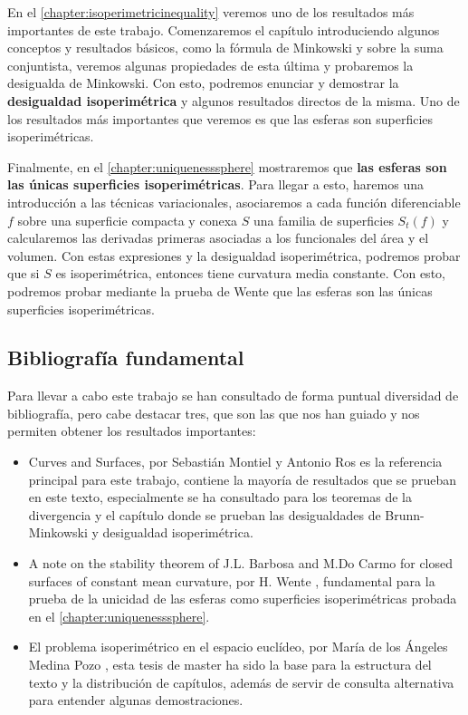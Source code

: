 En el \autoref{chapter:isoperimetricinequality} veremos uno de los resultados más importantes de este trabajo. Comenzaremos el capítulo introduciendo algunos conceptos y resultados básicos, como la fórmula de Minkowski y sobre la suma conjuntista, veremos algunas propiedades de esta última y probaremos la desigualda de Minkowski. Con esto, podremos enunciar y demostrar la \textbf{desigualdad isoperimétrica} y algunos resultados directos de la misma. Uno de los resultados más importantes que veremos es que las esferas son superficies isoperimétricas.

Finalmente, en el \autoref{chapter:uniquenesssphere} mostraremos que \textbf{las esferas son las únicas superficies isoperimétricas}. Para llegar a esto, haremos una introducción a las técnicas variacionales, asociaremos a cada función diferenciable $f$ sobre una superficie compacta y conexa $S$ una familia de superficies $S_t(f)$ y calcularemos las derivadas primeras asociadas a los funcionales del área y el volumen. Con estas expresiones y la desigualdad isoperimétrica, podremos probar que si $S$ es isoperimétrica, entonces tiene curvatura media constante. Con esto, podremos probar mediante la prueba de Wente que las esferas son las únicas superficies isoperimétricas.

\subsection{Bibliografía fundamental}

Para llevar a cabo este trabajo se han consultado de forma puntual diversidad de bibliografía, pero cabe destacar tres, que son las que nos han guiado y nos permiten obtener los resultados importantes:

\begin{itemize}
    \item Curves and Surfaces, por Sebastián Montiel y Antonio Ros \cite{montielrosbook} es la referencia principal para este trabajo, contiene la mayoría de resultados que se prueban en este texto, especialmente se ha consultado para los teoremas de la divergencia y el capítulo donde se prueban las desigualdades de Brunn-Minkowski y desigualdad isoperimétrica.
    \item A note on the stability theorem of J.L. Barbosa and M.Do Carmo for closed surfaces of constant mean curvature, por H. Wente \cite{wenteproof}, fundamental para la prueba de la unicidad de las esferas como superficies isoperimétricas probada en el \autoref{chapter:uniquenesssphere}.
    \item El problema isoperimétrico en el espacio euclídeo, por María de los Ángeles Medina Pozo \cite{mastermedinapozo}, esta tesis de master ha sido la base para la estructura del texto y la distribución de capítulos, además de servir de consulta alternativa para entender algunas demostraciones.
\end{itemize}

